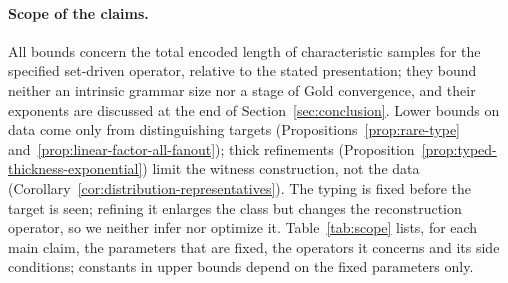 \paragraph{Scope of the claims.}
All bounds concern the total encoded length of characteristic samples for
the specified set-driven operator, relative to the stated presentation;
they bound neither an intrinsic grammar size nor a stage of Gold
convergence, and their exponents are discussed at the end of
Section~\ref{sec:conclusion}.  Lower bounds on data come only from
distinguishing targets (Propositions~\ref{prop:rare-type}
and~\ref{prop:linear-factor-all-fanout}); thick refinements
(Proposition~\ref{prop:typed-thickness-exponential}) limit the witness
construction, not the data (Corollary~\ref{cor:distribution-representatives}).
The typing is fixed before the target is seen; refining it enlarges the class
but changes the reconstruction operator, so we neither infer nor optimize it.
Table~\ref{tab:scope} lists, for each main claim, the parameters that are
fixed, the operators it concerns and its side conditions; constants in upper
bounds depend on the fixed parameters only.

